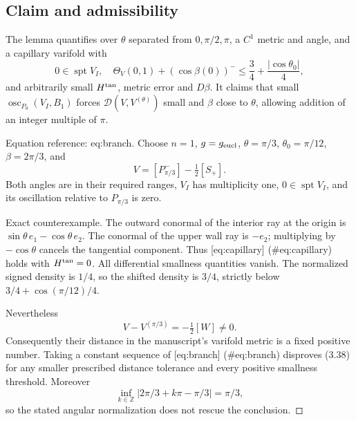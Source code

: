 \documentclass[10pt]{article}
\begin{document}
\subsection*{Claim and admissibility}
The lemma quantifies over \(\theta\) separated from \(0,\pi/2,\pi\), a \(C^1\) metric and angle, and a capillary varifold with \[0\in\operatorname{spt}V_I,\quad
 \Theta_V(0,1)+(\cos\beta(0))^-
 \leq\frac34+\frac{|\cos\theta_0|}{4},\] and arbitrarily small \(H^{\rm tan}\), metric error and \(D\beta\). It claims that small \(\operatorname{osc}_{P_\theta}(V_I,B_1)\) forces \(\mathcal D(V,V^{(\theta)})\) small and \(\beta\) close to \(\theta\), allowing addition of an integer multiple of \(\pi\).\par
Equation reference: eq:branch. Choose \(n=1\), \(g=g_{\rm eucl}\), \(\theta=\pi/3\), \(\theta_0=\pi/12\), \(\beta=2\pi/3\), and \[
 V=[P_{\pi/3}^-]-\tfrac12[S_+].\] Both angles are in their required ranges, \(V_I\) has multiplicity one, \(0\in\operatorname{spt}V_I\), and its oscillation relative to \(P_{\pi/3}\) is zero.\par
Exact counterexample. The outward conormal of the interior ray at the origin is \(\sin\theta\,e_1-\cos\theta\,e_2\). The conormal of the upper wall ray is \(-e_2\); multiplying by \(-\cos\theta\) cancels the tangential component. Thus [eq:capillary] (\#eq:capillary) holds with \(H^{\rm tan}=0\). All differential smallness quantities vanish. The normalized signed density is \(1/4\), so the shifted density is \(3/4\), strictly below \(3/4+\cos(\pi/12)/4\).\par
Nevertheless \[V-V^{(\pi/3)}=-\tfrac12[W]\ne0.\] Consequently their distance in the manuscript’s varifold metric is a fixed positive number. Taking a constant sequence of [eq:branch] (\#eq:branch) disproves (3.38) for any smaller prescribed distance tolerance and every positive smallness threshold. Moreover \[\inf_{k\in\mathbb Z}|2\pi/3+k\pi-\pi/3|=\pi/3,\] so the stated angular normalization does not rescue the conclusion. ◻\par
\end{document}

